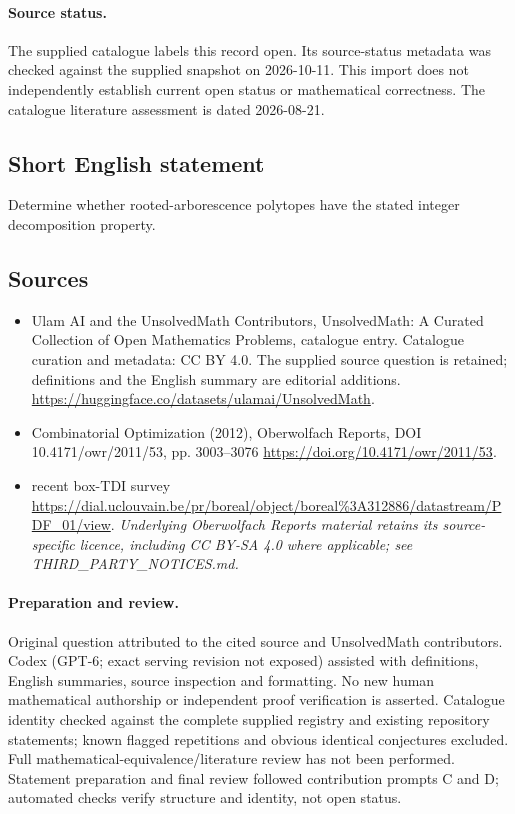 \documentclass[11pt]{article}
\begin{document}
\paragraph{Source status.}
The supplied catalogue labels this record open. Its source-status metadata was checked against the supplied snapshot on 2026-10-11. This import does not independently establish current open status or mathematical correctness. The catalogue literature assessment is dated 2026-08-21.
\subsection{Short English statement}
Determine whether rooted-arborescence polytopes have the stated integer decomposition property.
\subsection{Sources}
\begin{itemize}
\item[S1] Ulam AI and the UnsolvedMath Contributors, UnsolvedMath: A Curated Collection of Open Mathematics Problems, catalogue entry. Catalogue curation and metadata: CC BY 4.0. The supplied source question is retained; definitions and the English summary are editorial additions.
\url{https://huggingface.co/datasets/ulamai/UnsolvedMath}.
\item[S2] Combinatorial Optimization (2012), Oberwolfach Reports, DOI 10.4171/owr/2011/53, pp. 3003--3076
\url{https://doi.org/10.4171/owr/2011/53}.
\item[S3] recent box-TDI survey
\url{https://dial.uclouvain.be/pr/boreal/object/boreal%3A312886/datastream/PDF_01/view}.
\textit{Underlying Oberwolfach Reports material retains its source-specific licence, including CC BY-SA 4.0 where applicable; see THIRD\_PARTY\_NOTICES.md.}
\end{itemize}
\paragraph{Preparation and review.}
Original question attributed to the cited source and UnsolvedMath contributors. Codex (GPT-6; exact serving revision not exposed) assisted with definitions, English summaries, source inspection and formatting. No new human mathematical authorship or independent proof verification is asserted. Catalogue identity checked against the complete supplied registry and existing repository statements; known flagged repetitions and obvious identical conjectures excluded. Full mathematical-equivalence/literature review has not been performed. Statement preparation and final review followed contribution prompts C and D; automated checks verify structure and identity, not open status.
\label{end:statement}
\end{document}
